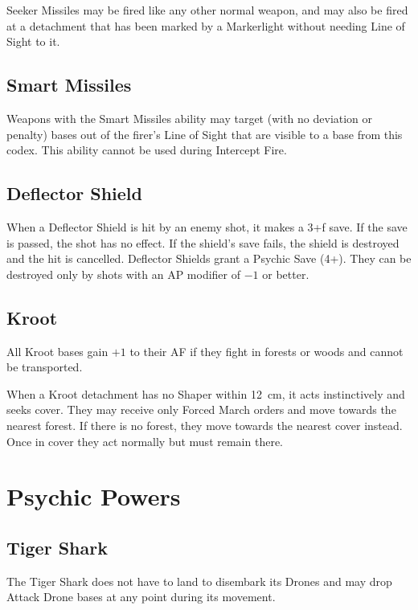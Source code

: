 Seeker Missiles may be fired like any other normal weapon, and may also be fired at a detachment that has been marked by a Markerlight without needing Line of Sight to it.

\subsection{Smart Missiles}

Weapons with the Smart Missiles ability may target (with no deviation or penalty) bases out of the firer's Line of Sight that are visible to a base from this codex. This ability cannot be used during Intercept Fire.

\subsection{Deflector Shield}

When a Deflector Shield is hit by an enemy shot, it makes a 3+f save. If the save is passed, the shot has no effect. If the shield's save fails, the shield is destroyed and the hit is cancelled. Deflector Shields grant a Psychic Save (4+). They can be destroyed only by shots with an AP modifier of $-1$ or better.

\subsection{Kroot}

All Kroot bases gain $+1$ to their AF if they fight in forests or woods and cannot be transported.

When a Kroot detachment has no Shaper within 12~cm, it acts instinctively and seeks cover. They may receive only Forced March orders and move towards the nearest forest. If there is no forest, they move towards the nearest cover instead. Once in cover they act normally but must remain there.

\section{Psychic Powers}

\subsection{Tiger Shark}

The Tiger Shark does not have to land to disembark its Drones and may drop Attack Drone bases at any point during its movement.

